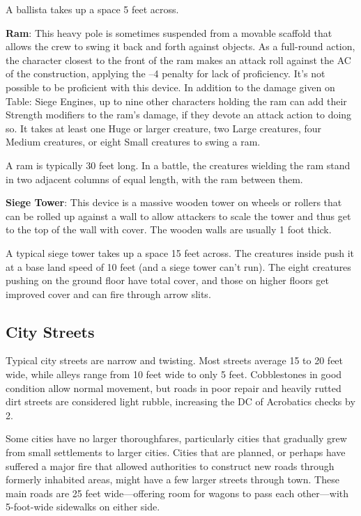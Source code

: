 A ballista takes up a space 5 feet across.
				
\textbf{Ram}: This heavy pole is sometimes suspended from a movable scaffold that allows the crew to swing it back and forth against objects. As a full-round action, the character closest to the front of the ram makes an attack roll against the AC of the construction, applying the --4 penalty for lack of proficiency. It's not possible to be proficient with this device. In addition to the damage given on Table: Siege Engines, up to nine other characters holding the ram can add their Strength modifiers to the ram's damage, if they devote an attack action to doing so. It takes at least one Huge or larger creature, two Large creatures, four Medium creatures, or eight Small creatures to swing a ram.
				
A ram is typically 30 feet long. In a battle, the creatures wielding the ram stand in two adjacent columns of equal length, with the ram between them.
				
\textbf{Siege Tower}: This device is a massive wooden tower on wheels or rollers that can be rolled up against a wall to allow attackers to scale the tower and thus get to the top of the wall with cover. The wooden walls are usually 1 foot thick.
				
A typical siege tower takes up a space 15 feet across. The creatures inside push it at a base land speed of 10 feet (and a siege tower can't run). The eight creatures pushing on the ground floor have total cover, and those on higher floors get improved cover and can fire through arrow slits.
				
\subsection{City Streets}

				
Typical city streets are narrow and twisting. Most streets average 15 to 20 feet wide, while alleys range from 10 feet wide to only 5 feet. Cobblestones in good condition allow normal movement, but roads in poor repair and heavily rutted dirt streets are considered light rubble, increasing the DC of Acrobatics checks by 2.
				
Some cities have no larger thoroughfares, particularly cities that gradually grew from small settlements to larger cities. Cities that are planned, or perhaps have suffered a major fire that allowed authorities to construct new roads through formerly inhabited areas, might have a few larger streets through town. These main roads are 25 feet wide---offering room for wagons to pass each other---with 5-foot-wide sidewalks on either side.
				
